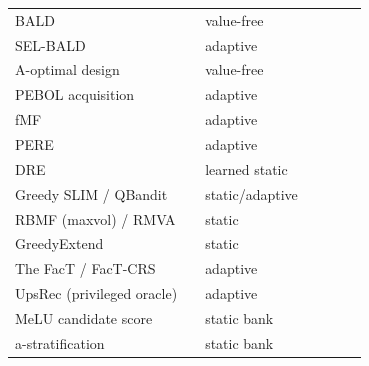 \documentclass[11pt]{article}
\newcommand{\cmark}{\ding{51}}
\newcommand{\xmark}{\ding{55}}
\begin{document}
\begin{table}[t]
\begin{tabular}{lllcccc}
BALD & \cite{houlsby2011bald} & value-free & \cmark & \cmark & \xmark & \xmark \\
SEL-BALD & \cite{gao2024selbald} & adaptive & \xmark & \xmark & \xmark & \xmark \\
A-optimal design & \cite{anava2015budget,sepliarskaia2018spq} & value-free & \cmark & \cmark & \xmark & \xmark \\
PEBOL acquisition & \cite{austin2024bayesian} & adaptive & \xmark & \xmark & \xmark & \xmark \\
fMF & \cite{zhou2011functional} & adaptive & \xmark & \xmark & \xmark & \xmark \\
PERE & \cite{nguyen2024pere} & adaptive & \xmark & \xmark & \xmark & \xmark \\
DRE & \cite{kweon2020deep} & learned static & \cmark & \cmark & \cmark & \xmark \\
Greedy SLIM / QBandit & \cite{proissl2024greedyslim,christakopoulou2016towards} & static/adaptive & \xmark & \xmark & \xmark & \xmark \\
RBMF (maxvol) / RMVA & \cite{liu2011wisdom,fonarev2016rectangular} & static & \xmark & \xmark & \xmark & \xmark \\
GreedyExtend & \cite{golbandi2010bootstrapping} & static & \xmark & \xmark & \xmark & \xmark \\
The FacT / FacT-CRS & \cite{tao2019fact,haque2022factcrs} & adaptive & \xmark & \xmark & \xmark & \xmark \\
UpsRec (privileged oracle) & \cite{lin2023upsrec} & adaptive & \xmark & \xmark & \xmark & \xmark \\
MeLU candidate score & \cite{lee2019melu} & static bank & \xmark & \xmark & \xmark & \xmark \\
a-stratification & \cite{chang1999astratification} & static bank & \xmark & \xmark & \xmark & \xmark \\
\bottomrule
\end{tabular}
\end{table}
\end{document}
